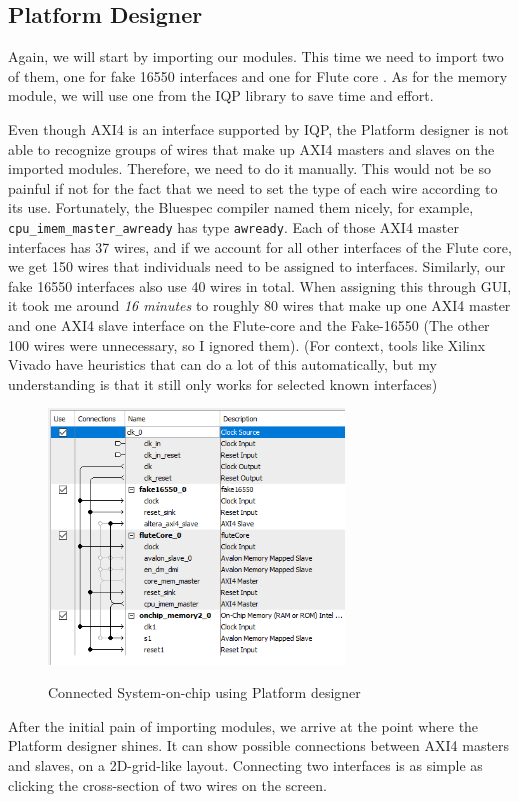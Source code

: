 \documentclass[12pt]{report}
\begin{document}
\subsection{Platform Designer} 
Again, we will start by importing our modules.  
This time we need to import two of them, one for fake 16550 interfaces and one for Flute core \cite{Flute core}.  
As for the memory module, we will use one from the IQP library to save time and effort. 
\par 
Even though AXI4 is an interface supported by IQP, the Platform designer is not able to recognize groups of wires that make up AXI4 masters and slaves on the imported modules. 
Therefore, we need to do it manually. This would not be so painful if not for the fact that we need to set the type of each wire according to its use. Fortunately, the Bluespec compiler named them nicely, for example, \verb!cpu_imem_master_awready! has type \verb!awready!. Each of those AXI4 master interfaces has 37 wires, and if we account for all other interfaces of the Flute core, we get 150 wires that individuals need to be assigned to interfaces. Similarly, our fake 16550 interfaces also use 40 wires in total. When assigning this through GUI, it took me around \emph{16 minutes} to roughly 80 wires that make up one AXI4 master and one AXI4 slave interface on the Flute-core and the Fake-16550 (The other 100 wires were unnecessary, so I ignored them). (For context, tools like Xilinx Vivado have heuristics that can do a lot of this automatically, but my understanding is that it still only works for selected known interfaces) 
\\ 
\begin{figure}[H] 
   \caption{Connected System-on-chip using Platform designer} 
   \includegraphics[width=0.7\textwidth]{images/Example2QSys.png} \\ 
   \centering 
\end{figure} 
After the initial pain of importing modules, we arrive at the point where the Platform designer shines. It can show possible connections between AXI4 masters and slaves, on a 2D-grid-like layout. Connecting two interfaces is as simple as clicking the cross-section of two wires on the screen.  
\end{document}
